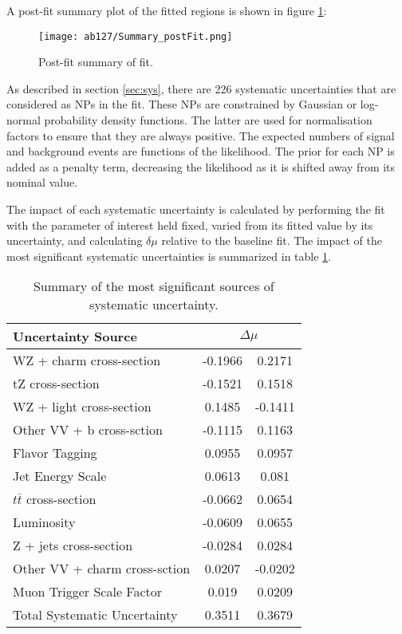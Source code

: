 A post-fit summary plot of the fitted regions is shown in figure \ref{fig:fit_results}: 

\begin{figure}[h!]
    \center
    \texttt{[image: ab127/Summary\_postFit.png]}
    \caption{Post-fit summary of fit.}
    \label{fig:fit_results}
\end{figure}

As described in section \ref{sec:sys}, there are 226 systematic uncertainties that are considered as NPs in the fit. These NPs are constrained by Gaussian or log-normal probability density functions. The latter are used for normalisation factors to ensure that they are always positive. The expected numbers
of signal and background events are functions of the likelihood. The prior for each NP is added as a penalty term, decreasing the likelihood as it is shifted away from its nominal value. 

The impact of each systematic uncertainty is calculated by performing the fit with the parameter of interest held fixed, varied from its fitted value by its uncertainty, and calculating $\delta\mu$ relative to the baseline fit.  The impact of the most significant systematic uncertainties is summarized in table \ref{tab:systematics}. 

\begin{table}[h]
    \centering
    \begin{tabular}{l|cc}
        \hline\hline
        Uncertainty Source & \multicolumn{2}{c}{$\Delta \mu$ }  \\
        \hline
        WZ + charm cross-section & -0.1966 & 0.2171 \\
        tZ cross-section & -0.1521 & 0.1518 \\
        WZ + light cross-section & 0.1485 & -0.1411 \\
        Other VV + b cross-sction & -0.1115 & 0.1163 \\
        Flavor Tagging & 0.0955 & 0.0957 \\
        Jet Energy Scale & 0.0613 & 0.081 \\
        $t\bar{t}$ cross-section & -0.0662 & 0.0654 \\
        Luminosity & -0.0609 & 0.0655 \\
        Z + jets cross-section & -0.0284 & 0.0284 \\
        Other VV + charm cross-sction & 0.0207 & -0.0202 \\
        Muon Trigger Scale Factor & 0.019 & 0.0209 \\
        \hline
        Total Systematic Uncertainty & 0.3511 & 0.3679 \\
        \hline\hline
    \end{tabular}
    \caption{Summary of the most significant sources of systematic uncertainty.}
    \label{tab:systematics}
\end{table}

